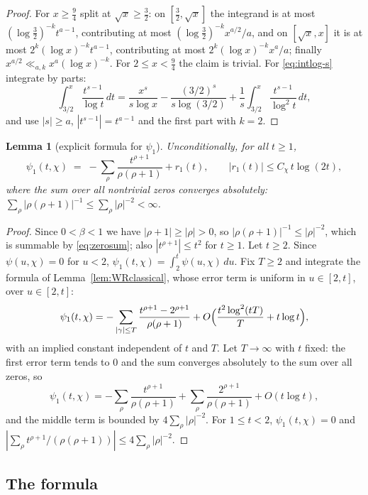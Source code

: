 \documentclass[11pt]{amsart}
\newtheorem{lemma}[theorem]{Lemma}
\theoremstyle{definition}
\numberwithin{equation}{section}
\begin{document}
\begin{proof}
For $x\ge\tfrac94$ split at $\sqrt x\ge\tfrac32$: on
$[\tfrac32,\sqrt x]$ the integrand is at most
$(\log\tfrac32)^{-k}t^{a-1}$, contributing at most
$(\log\tfrac32)^{-k}x^{a/2}/a$, and on $[\sqrt x,x]$ it is at most
$2^k(\log x)^{-k}t^{a-1}$, contributing at most
$2^k(\log x)^{-k}x^a/a$; finally
$x^{a/2}\ll_{a,k}x^a(\log x)^{-k}$. For $2\le x<\tfrac94$ the claim is
trivial. For \eqref{eq:intlog-s} integrate by parts:
\[
\int_{3/2}^x\frac{t^{s-1}}{\log t}\,dt
=\frac{x^s}{s\log x}-\frac{(3/2)^s}{s\log(3/2)}
+\frac1s\int_{3/2}^x\frac{t^{s-1}}{\log^2t}\,dt ,
\]
and use $|s|\ge a$, $|t^{s-1}|=t^{a-1}$ and the first part with $k=2$.
\end{proof}

\begin{lemma}[explicit formula for $\psi_1$]\label{lem:psi1}
Unconditionally, for all $t\ge1$,
\[
\psi_1(t,\chi)\;=\;-\sum_\rho\frac{t^{\rho+1}}{\rho(\rho+1)}+r_1(t),
\qquad |r_1(t)|\le C_\chi\,t\log(2t),
\]
where the sum over all nontrivial zeros converges absolutely:
$\sum_\rho|\rho(\rho+1)|^{-1}\le\sum_\rho|\rho|^{-2}<\infty$.
\end{lemma}

\begin{proof}
Since $0<\beta<1$ we have $|\rho+1|\ge|\rho|>0$, so
$|\rho(\rho+1)|^{-1}\le|\rho|^{-2}$, which is summable by
\eqref{eq:zerosum}; also $|t^{\rho+1}|\le t^2$ for $t\ge1$. Let
$t\ge2$. Since $\psi(u,\chi)=0$ for $u<2$,
$\psi_1(t,\chi)=\int_2^t\psi(u,\chi)\,du$. Fix $T\ge2$ and integrate
the formula of Lemma~\ref{lem:WRclassical}, whose error term is
uniform in $u\in[2,t]$, over $u\in[2,t]$:
\[
\psi_1(t,\chi)=-\sum_{|\gamma|\le T}
\frac{t^{\rho+1}-2^{\rho+1}}{\rho(\rho+1)}
+O\Bigl(\frac{t^2\log^2(tT)}{T}+t\log t\Bigr),
\]
with an implied constant independent of $t$ and $T$. Let
$T\to\infty$ with $t$ fixed: the first error term tends to $0$ and
the sum converges absolutely to the sum over all zeros, so
\[
\psi_1(t,\chi)=-\sum_\rho\frac{t^{\rho+1}}{\rho(\rho+1)}
+\sum_\rho\frac{2^{\rho+1}}{\rho(\rho+1)}+O(t\log t),
\]
and the middle term is bounded by $4\sum_\rho|\rho|^{-2}$. For
$1\le t<2$, $\psi_1(t,\chi)=0$ and
$|\sum_\rho t^{\rho+1}/(\rho(\rho+1))|\le4\sum_\rho|\rho|^{-2}$.
\end{proof}

\subsection{The formula}
\end{document}

